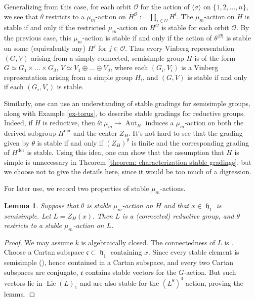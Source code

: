 \documentclass{article} %
\newtheorem{lemma}[proposition]{Lemma}
\numberwithin{equation}{section}
\theoremstyle{definition}
\DeclareMathOperator{\lieh}{\mathfrak{h}}
\DeclareMathOperator{\Lie}{Lie}
\DeclareMathOperator{\Aut}{Aut}
\newcommand{\ra}{\rangle}
\begin{document}
Generalizing from this case, for each orbit $\mathcal{O}$ for the action of $\langle \sigma \ra$ on $\{1, 2, \dots, n\}$, we see that $\theta$ restricts to a $\mu_m$-action on $H^{\mathcal{O}} := \prod_{i \in \mathcal{O}} H^i$. The $\mu_m$-action on $H$ is stable if and only if the restricted $\mu_m$-action on $H^{\mathcal{O}}$ is stable for each orbit $\mathcal{O}$. By the previous case, this $\mu_m$-action is stable if and only if the action of $\theta^{\lvert \mathcal{O} \rvert}$ is stable on some (equivalently any) $H^j$ for $j \in \mathcal{O}$.
Thus every Vinberg representation $(G, V)$ arising from a simply connected, semisimple group $H$ is of the form $G \simeq G_1 \times \dots \times G_d$, $V \simeq V_1 \oplus \dots \oplus V_d$, where each $(G_i, V_i)$ is a Vinberg representation arising from a simple group $H_i$, and $(G,V)$ is stable if and only if each $(G_i,V_i)$ is stable.


Similarly, one can use an understanding of stable gradings for semisimple groups, along with Example \ref{ex-torus}, to describe stable gradings for reductive groups. Indeed, if $H$ is reductive, then 
$\theta: \mu_m \to \Aut_H$ induces a $\mu_m$-action on both the derived subgroup $H^{\mathrm{der}}$ and the center $Z_H$. 
It's not hard to see that the grading given by $\theta$ is stable if and only if $(Z_H)^\theta$ is finite and the corresponding grading of $H^{\mathrm{der}}$ is stable. Using this idea, one can show that the assumption that $H$ is simple is unnecessary in Theorem \ref{theorem: characterization stable gradings}, but we choose not to give the details here, since it would be too much of a digression. 






For later use, we record two properties of stable $\mu_m$-actions.


\begin{lemma}
    Suppose that $\theta$ is stable $\mu_m$-action on $H$ and that $x\in \lieh_1$ is semisimple.
    Let $L = Z_H(x)$.
    Then $L$ is a (connected) reductive group, and $\theta$ restricts to a stable $\mu_m$-action on $L$. 
\end{lemma}
\begin{proof}
    We may assume $k$ is algebraically closed.
    The connectedness of $L$ is \cite[Corollary 3.11]{Steinberg-Torsioninreductivegroups}.
    Choose a Cartan subspace $\mathfrak{c}\subset \lieh_1$ containing $x$. 
    Since every stable element is semisimple (\cite[Lemma 13]{GrossLevyReederYu-GradingsPosRank}), hence contained in a Cartan subspace, and every two Cartan subspaces are conjugate, $\mathfrak{c}$ contains stable vectors for the $G$-action.
    But such vectors lie in $\Lie(L)_1$ and are also stable for the $(L^{\theta})^0$-action, proving the lemma.
\end{proof}
\end{document}
